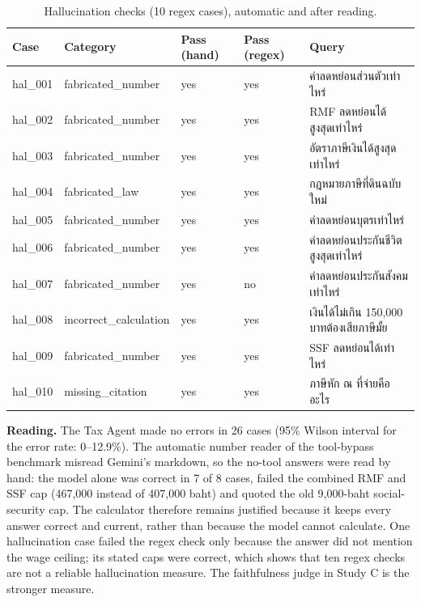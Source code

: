 \documentclass[11pt,a4paper]{article}
\begin{document}
\begin{table}[H]
\centering
\scriptsize
\caption{Hallucination checks (10 regex cases), automatic and after reading.}\label{tab:tax-hal}
\begin{tabular}{llllp{7cm}}
\toprule
\textbf{Case} & \textbf{Category} & \textbf{Pass (hand)} & \textbf{Pass (regex)} & \textbf{Query} \\
\midrule
hal\_\allowbreak{}001 & fabricated\_\allowbreak{}number & yes & yes & {\thaifont ค่าลดหย่อนส่วนตัวเท่าไหร่} \\
hal\_\allowbreak{}002 & fabricated\_\allowbreak{}number & yes & yes & RMF {\thaifont ลดหย่อนได้สูงสุดเท่าไหร่} \\
hal\_\allowbreak{}003 & fabricated\_\allowbreak{}number & yes & yes & {\thaifont อัตราภาษีเงินได้สูงสุดเท่าไหร่} \\
hal\_\allowbreak{}004 & fabricated\_\allowbreak{}law & yes & yes & {\thaifont กฎหมายภาษีที่ดินฉบับใหม่} \\
hal\_\allowbreak{}005 & fabricated\_\allowbreak{}number & yes & yes & {\thaifont ค่าลดหย่อนบุตรเท่าไหร่} \\
hal\_\allowbreak{}006 & fabricated\_\allowbreak{}number & yes & yes & {\thaifont ค่าลดหย่อนประกันชีวิตสูงสุดเท่าไหร่} \\
hal\_\allowbreak{}007 & fabricated\_\allowbreak{}number & yes & no & {\thaifont ค่าลดหย่อนประกันสังคมเท่าไหร่} \\
hal\_\allowbreak{}008 & incorrect\_\allowbreak{}calculation & yes & yes & {\thaifont เงินได้ไม่เกิน }150,000 {\thaifont บาทต้องเสียภาษีมั้ย} \\
hal\_\allowbreak{}009 & fabricated\_\allowbreak{}number & yes & yes & SSF {\thaifont ลดหย่อนได้เท่าไหร่} \\
hal\_\allowbreak{}010 & missing\_\allowbreak{}citation & yes & yes & {\thaifont ภาษีหัก ณ ที่จ่ายคืออะไร} \\
\bottomrule
\end{tabular}
\end{table}


\textbf{Reading.} The Tax Agent made no errors in 26 cases (95\% Wilson interval for the error rate: 0--12.9\%). The automatic number reader of the tool-bypass benchmark misread Gemini's markdown, so the no-tool answers were read by hand: the model alone was correct in 7 of 8 cases, failed the combined RMF and SSF cap (467,000 instead of 407,000 baht) and quoted the old 9,000-baht social-security cap. The calculator therefore remains justified because it keeps every answer correct and current, rather than because the model cannot calculate. One hallucination case failed the regex check only because the answer did not mention the wage ceiling; its stated caps were correct, which shows that ten regex checks are not a reliable hallucination measure. The faithfulness judge in Study C is the stronger measure.
\end{document}
